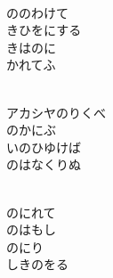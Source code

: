 \documentclass[10pt,b5j]{tarticle} %
\begin{document}
\vspace{1.5em} %
\newcommand{\linespace}{0.5em} %
\newcommand{\blocksize}{0.5\hsize} %
\newcommand{\itemmargin}{3em} %
\begin{enumerate} %
    \setlength{\itemindent}{\itemmargin} %
    \begin{minipage}[c]{\blocksize}
    
        \vspace{\linespace}
        \item~\\
        ののわけて\\
        きひをにする\\
        きはのに\\
        かれてふ
        
    \end{minipage}
    \begin{minipage}[c]{\blocksize}
        
        \vspace{\linespace}
        \item~\\
        アカシヤのりくべ\\
        のかにぶ\\
        いのひゆけば\\
        のはなくりぬ
        
    \end{minipage}
    \begin{minipage}[c]{\blocksize}
        
        \vspace{\linespace}
        \item~\\
        のにれて\\
        のはもし\\
        のにり\\
        しきのをる
        

\end{minipage}
\end{enumerate}
\end{document}
